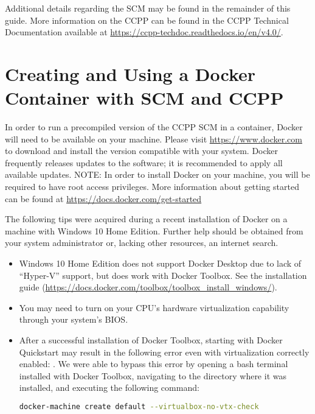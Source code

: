 Additional details regarding the SCM may be found in the remainder of this guide. More information on the CCPP can be found in the CCPP Technical Documentation available at \url{https://ccpp-techdoc.readthedocs.io/en/v4.0/}.

\section{Creating and Using a Docker Container with SCM and CCPP}
\label{docker}

In order to run a precompiled version of the CCPP SCM in a container, Docker will need to be available on your machine. Please visit \url{https://www.docker.com} to download and install the version compatible with your system. Docker frequently releases updates to the software; it is recommended to apply all available updates. NOTE: In order to install Docker on your machine, you will be required to have root access privileges. More information about getting started can be found at \url{https://docs.docker.com/get-started}

The following tips were acquired during a recent installation of Docker on a machine with Windows 10 Home Edition. Further help should be obtained from your system administrator or, lacking other resources, an internet search.

\begin{itemize}
\item Windows 10 Home Edition does not support Docker Desktop due to lack of ``Hyper-V'' support, but does work with Docker Toolbox. See the installation guide (\url{https://docs.docker.com/toolbox/toolbox_install_windows/}).
\item You may need to turn on your CPU's hardware virtualization capability through your system's BIOS.
\item After a successful installation of Docker Toolbox, starting with Docker Quickstart may result in the following error even with virtualization correctly enabled: . We were able to bypass this error by opening a bash terminal installed with Docker Toolbox, navigating to the directory where it was installed, and executing the following command:
\begin{lstlisting}[language=bash]
docker-machine create default --virtualbox-no-vtx-check
\end{lstlisting}
\end{itemize}

